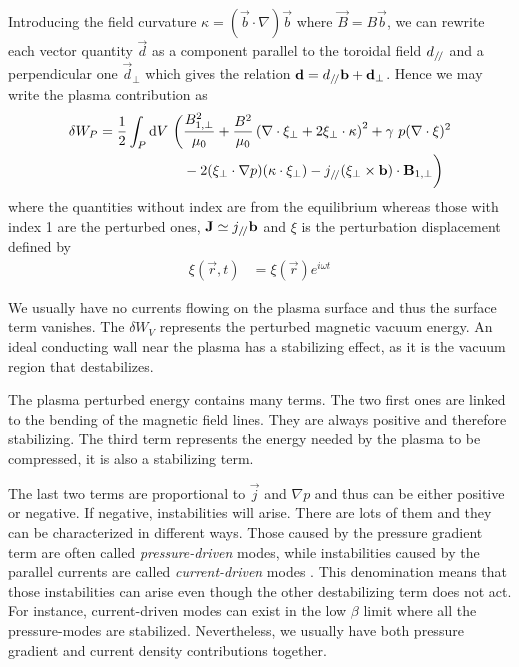 Introducing the field curvature $\kappa = ( \vec{b} \cdot \nabla ) \vec{b}$ where $\vec{B} = B \vec{b}$, we can rewrite each vector quantity $\vec{d}$ as a component parallel to the toroidal field $d_{/\!/}$ and a perpendicular one $\vec{d}_{\perp}$ which gives the relation $\mathbf{d} = d_{/\!/} \mathbf{b} + \mathbf{d}_{\perp}$. Hence we may write the plasma contribution as \cite{boyd-sanderson}
\begin{align}\nonumber
	\delta W_P = \frac{1}{2} \int_{P} \textrm{d} V\ \bigg( & \frac{B_{1,\perp}^2}{\mu_0} + \frac{B^2}{\mu_0} \left( \nabla \cdot \xi_{\perp} + 2 \xi_{\perp} \cdot \kappa \right)^2 + \gamma\ p (\nabla \cdot \xi)^2\\
												    & - 2 ( \xi_{\perp} \cdot \nabla p ) ( \kappa \cdot \xi_{\perp} ) - j_{/\!/} ( \xi_{\perp} \times \mathbf{b} ) \cdot \mathbf{B}_{1,\perp} \bigg)
	\label{eq:MHD:deltaWP2}
\end{align}
where the quantities without index are from the equilibrium whereas those with index 1 are the perturbed ones, $\mathbf{J} \simeq j_{/\!/} \mathbf{b}$ and $\xi$ is the perturbation displacement defined by
\begin{align}
	\xi(\vec{r},t) & = \xi(\vec{r}) e^{i \omega t}           \label{eq:MHD:xiexp}%
\end{align}

We usually have no currents flowing on the plasma surface and thus the surface term vanishes. The $\delta W_V$ represents the perturbed magnetic vacuum energy. An ideal conducting wall near the plasma has a stabilizing effect, as it is the vacuum region that destabilizes.

The plasma perturbed energy contains many terms. The two first ones are linked to the bending of the magnetic field lines. They are always positive and therefore stabilizing. The third term represents the energy needed by the plasma to be compressed, it is also a stabilizing term.

The last two terms are proportional to $\vec{j}$ and $\nabla p$ and thus can be either positive or negative. If negative, instabilities will arise. There are lots of them and they can be characterized in different ways. Those caused by the pressure gradient term are often called \emph{pressure-driven} modes, while instabilities caused by the parallel currents are called \emph{current-driven} modes \cite{boyd-sanderson,freidberg}. This denomination means that those instabilities can arise even though the other destabilizing term does not act. For instance, current-driven modes can exist in the low $\beta$ limit where all the pressure-modes are stabilized. Nevertheless, we usually have both pressure gradient and current density contributions together.
